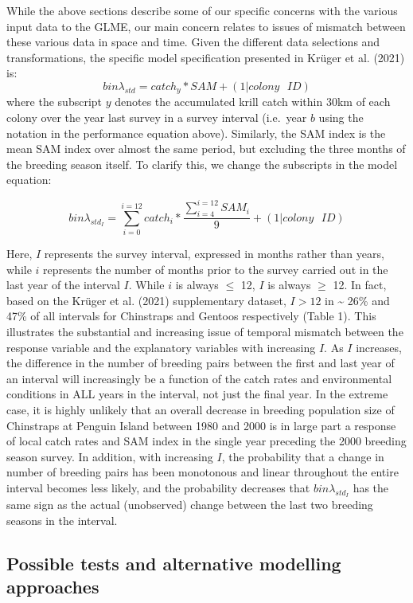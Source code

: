 \documentclass[]{elsarticle} %
\begin{document}
While the above sections describe some of our specific concerns with the
various input data to the GLME, our main concern relates to issues of
mismatch between these various data in space and time. Given the
different data selections and transformations, the specific model
specification presented in Krüger et al. (2021) is:
\[bin\lambda_{std}=catch_y*SAM+(1|colony\text{ }ID)\] where the
subscript \(y\) denotes the accumulated krill catch within 30km of each
colony over the year last survey in a survey interval (i.e.~year \(b\)
using the notation in the performance equation above). Similarly, the
SAM index is the mean SAM index over almost the same period, but
excluding the three months of the breeding season itself. To clarify
this, we change the subscripts in the model equation:

\[bin\lambda_{std_I}=\sum_{i=0}^{i=12}{catch_i}*\frac{\sum_{i=4}^{i=12}{SAM_i}}{9}+(1|colony\text{ }ID)\]

Here, \(I\) represents the survey interval, expressed in months rather
than years, while \(i\) represents the number of months prior to the
survey carried out in the last year of the interval \(I\). While \(i\)
is always \(\leqslant\) 12, \(I\) is always \(\geqslant\) 12. In fact,
based on the Krüger et al. (2021) supplementary dataset, \(I>12\) in
\textasciitilde{} 26\% and 47\% of all intervals for Chinstraps and
Gentoos respectively (Table 1). This illustrates the substantial and
increasing issue of temporal mismatch between the response variable and
the explanatory variables with increasing \(I\). As \(I\) increases, the
difference in the number of breeding pairs between the first and last
year of an interval will increasingly be a function of the catch rates
and environmental conditions in ALL years in the interval, not just the
final year. In the extreme case, it is highly unlikely that an overall
decrease in breeding population size of Chinstraps at Penguin Island
between 1980 and 2000 is in large part a response of local catch rates
and SAM index in the single year preceding the 2000 breeding season
survey. In addition, with increasing \(I\), the probability that a
change in number of breeding pairs has been monotonous and linear
throughout the entire interval becomes less likely, and the probability
decreases that \(bin\lambda_{std_I}\) has the same sign as the actual
(unobserved) change between the last two breeding seasons in the
interval.

\hypertarget{possible-tests-and-alternative-modelling-approaches}{%
\subsection{Possible tests and alternative modelling
approaches}\label{possible-tests-and-alternative-modelling-approaches}}
\end{document}
